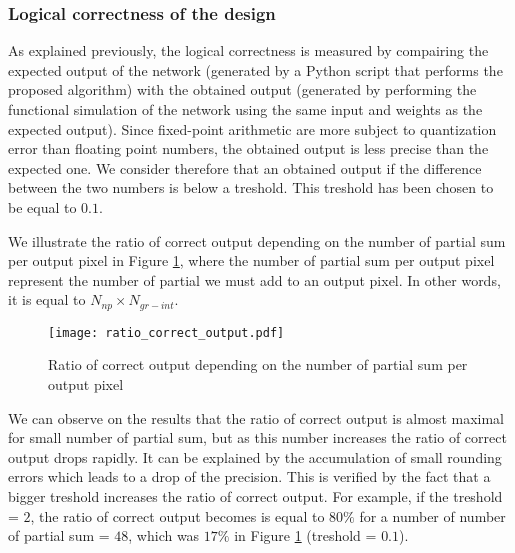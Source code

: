 \subsubsection{Logical correctness of the design}
%
As explained previously, the logical correctness is measured by compairing the expected output of the network (generated by a Python script that performs the proposed algorithm) with the obtained output (generated by performing the functional simulation of the network using the same input and weights as the expected output). Since fixed-point arithmetic are more subject to quantization error than floating point numbers, the obtained output is less precise than the expected one. We consider therefore that an obtained output if the difference between the two numbers is below a treshold. This treshold has been chosen to be equal to $0.1$.

We illustrate the ratio of correct output depending on the number of partial sum per output pixel in Figure \ref{fig:res-output}, where the number of partial sum per output pixel represent the number of partial we must add to an output pixel. In other words, it is equal to $N_{np} \times N_{gr-int}$.
%
\begin{figure}[H]
    \centering
    \texttt{[image: ratio\_correct\_output.pdf]}
    \caption{Ratio of correct output depending on the number of partial sum per output pixel}
    \label{fig:res-output}
\end{figure}

We can observe on the results that the ratio of correct output is almost maximal for small number of partial sum, but as this number increases the ratio of correct output drops rapidly. It can be explained by the accumulation of small rounding errors which leads to a drop of the precision. This is verified by the fact that a bigger treshold increases the ratio of correct output. For example, if the treshold = $2$, the ratio of correct output becomes is equal to $80\%$ for a number of number of partial sum = $48$, which was $17\%$ in Figure \ref{fig:res-output} (treshold = $0.1$).
%
